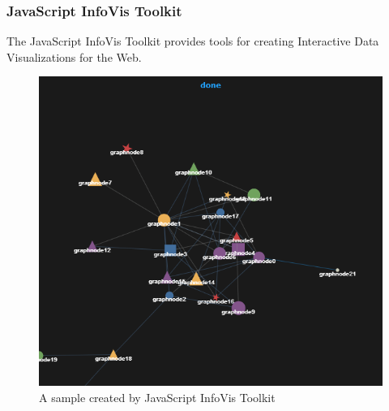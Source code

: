 \documentclass[14pt,a4paper]{extreport}
\begin{document}
 			\subsubsection{JavaScript InfoVis Toolkit}
				The JavaScript InfoVis Toolkit provides tools for creating Interactive Data Visualizations for the Web.
				\begin{figure}[ht]
 					\begin{center}
 						\includegraphics[scale=0.5]{JIT.png}
 						\caption{A sample created by JavaScript InfoVis Toolkit}
 					\end{center}
 				\end{figure} 
				
\end{document}
